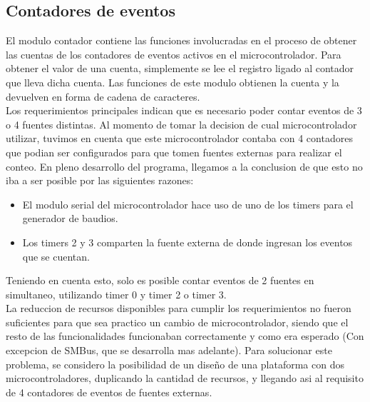 

\subsection{Contadores de eventos} %
\label{it2:sub:contadores_de_eventos}


El modulo contador contiene las funciones involucradas en el proceso de obtener las cuentas de los contadores de eventos activos en el microcontrolador. Para obtener el valor de una cuenta, simplemente se lee el registro ligado al contador que lleva dicha cuenta. Las funciones de este modulo obtienen la cuenta y la devuelven en forma de cadena de caracteres. \\

Los requerimientos principales indican que es necesario poder contar eventos de 3 o 4 fuentes distintas. Al momento de tomar la decision de cual microcontrolador utilizar, tuvimos en cuenta que este microcontrolador contaba con 4 contadores que podian ser configurados para que tomen fuentes externas para realizar el conteo. En pleno desarrollo del programa, llegamos a la conclusion de que esto no iba a ser posible por las siguientes razones:

\begin{itemize}
  \item El modulo serial del microcontrolador hace uso de uno de los timers para el generador de baudios.
  \item Los timers 2 y 3 comparten la fuente externa de donde ingresan los eventos que se cuentan.
\end{itemize}

Teniendo en cuenta esto, solo es posible contar eventos de 2 fuentes en simultaneo, utilizando timer 0 y timer 2 o timer 3. \\

La reduccion de recursos disponibles para cumplir los requerimientos no fueron suficientes para que sea practico un cambio de microcontrolador, siendo que el resto de las funcionalidades funcionaban correctamente y como era esperado (Con excepcion de SMBus, que se desarrolla mas adelante). Para solucionar este problema, se considero la posibilidad de un diseño de una plataforma con dos microcontroladores, duplicando la cantidad de recursos, y llegando asi al requisito de 4 contadores de eventos de fuentes externas.

